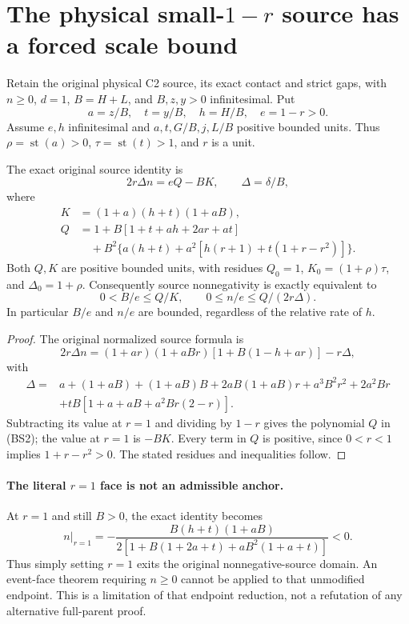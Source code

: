 \section{The physical small-$1-r$ source has a forced scale bound}
\label{sec:r12-small-gap-scale}

Retain the original physical C2 source, its exact contact and strict
gaps, with $n\ge0$, $d=1$, $B=H+L$, and $B,z,y>0$
infinitesimal. Put
\[
 a=z/B,\quad t=y/B,\quad h=H/B,\quad e=1-r>0.
\]
Assume $e,h$ infinitesimal and $a,t,G/B,j,L/B$ positive bounded
units. Thus $\rho=\operatorname{st}(a)>0$,
$\tau=\operatorname{st}(t)>1$, and $r$ is a unit.

\begin{lemma}
The exact original source identity is
\[
 2r\Delta n=eQ-BK,\qquad \Delta=\delta/B,             \tag{BS1}
\]
where
\[
\begin{split}
 K&=(1+a)(h+t)(1+aB),\\
 Q&=1+B[1+t+ah+2ar+at]\\
  &\quad+B^2\{a(h+t)+a^2[h(r+1)+t(1+r-r^2)]\}.
\end{split}                                            \tag{BS2}
\]
Both $Q,K$ are positive bounded units, with residues
$Q_0=1$, $K_0=(1+\rho)\tau$, and $\Delta_0=1+\rho$.
Consequently source nonnegativity is exactly equivalent to
\[
 0<B/e\le Q/K,\qquad
 0\le n/e\le Q/(2r\Delta).                            \tag{BS3}
\]
In particular $B/e$ and $n/e$ are bounded, regardless of the
relative rate of $h$.
\end{lemma}
\begin{proof}
The original normalized source formula is
\[
 2r\Delta n=(1+ar)(1+aBr)[1+B(1-h+ar)]-r\Delta,
\]
with
\[
\begin{split}
 \Delta={}&a+(1+aB)+(1+aB)B+2aB(1+aB)r+a^3B^2r^2
       +2a^2Br\\
       &+tB[1+a+aB+a^2Br(2-r)].
\end{split}
\]
Subtracting its value at $r=1$ and dividing by $1-r$ gives
the polynomial $Q$ in (BS2); the value at $r=1$ is $-BK$.
Every term in $Q$ is positive, since $0<r<1$ implies
$1+r-r^2>0$. The stated residues and inequalities follow.
\end{proof}

\paragraph{The literal $r=1$ face is not an admissible anchor.}
At $r=1$ and still $B>0$, the exact identity becomes
\[
 n\big|_{r=1}
 =-\frac{B(h+t)(1+aB)}
 {2[1+B(1+2a+t)+aB^2(1+a+t)]}<0.                      \tag{BS4}
\]
Thus simply setting $r=1$ exits the original nonnegative-source
domain. An event-face theorem requiring $n\ge0$ cannot be applied
to that unmodified endpoint. This is a limitation of that endpoint
reduction, not a refutation of any alternative full-parent proof.

